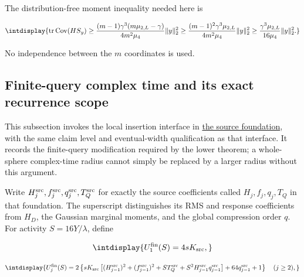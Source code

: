
The distribution-free moment inequality needed here is


\begingroup\renewcommand{\theHequation}{intdisplay.83}
\begin{equation*}
\intdisplay{
\operatorname{tr}\operatorname{Cov}(HS_y)
\ge\frac{(m-1)\gamma^3(m\mu_{2,L}-\gamma)}{4m^2\mu_4}
\|y\|_2^2
\ge\frac{(m-1)^2\gamma^3\mu_{2,L}}{4m^2\mu_4}\|y\|_2^2
\ge\frac{\gamma^3\mu_{2,L}}{16\mu_4}\|y\|_2^2.
}
\end{equation*}
\endgroup


No independence between the \(m\) coordinates is used.


\subsection{Finite-query complex time and its exact recurrence scope}
\label{int:dense-finite-query-source}


This subsection invokes the local insertion interface in \hyperref[int:source-foundations]{the source foundation}, with the same claim level and eventual-width qualification as that interface. It records the finite-query modification required by the lower theorem; a whole-sphere complex-time radius cannot simply be replaced by a larger radius without this argument.



Write \(H_j^{\rm src},\allowbreak f_j^{\rm src},\allowbreak q_j^{\rm src},\allowbreak T_Q^{\rm src}\) for exactly the source coefficients called \(H_j,\allowbreak f_j,\allowbreak q_j,\allowbreak T_Q\) in that foundation. The superscript distinguishes its RMS and response coefficients from \(H_D\), the Gaussian marginal moments, and the global compression order \(q\). For activity \(S=16Y/\lambda\), define


\begingroup\renewcommand{\theHequation}{intdisplay.84}
\begin{equation*}
\intdisplay{
U_1^{\rm fin}(S)=4sK_{\rm src},
}
\end{equation*}
\endgroup

\begingroup\renewcommand{\theHequation}{intdisplay.85}
\begin{equation*}
\intdisplay{
U_j^{\rm fin}(S)=2\left\{
sK_{\rm src}\left[(H_{j-1}^{\rm src})^2+(f_{j-1}^{\rm src})^2
+S T_Q^{\rm src}+S^2H_{j-1}^{\rm src}q_{j-1}^{\rm src}\right]
+64q_{j-1}^{\rm src}+1\right\}\quad(j\ge2),
}
\end{equation*}
\endgroup

